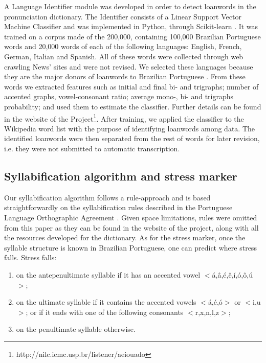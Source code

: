 A Language Identifier module was developed in order to detect loanwords in the pronunciation dictionary.
The Identifier consists of a Linear Support Vector Machine Classifier \cite{Steinwart2008} and was implemented in Python, 
through Scikit-learn \cite{Scikit2011}. It was trained on a corpus made of the 200,000, containing 100,000 Brazilian Portuguese
words and 20,000 words of each of the following languages: English, French, German, Italian and Spanish. All of these words were 
collected through web crawling News' sites and were not revised.
We selected these languages because they are the major donors of loanwords to Brazilian
Portuguese \cite{Alves2001}. From these words we extracted features such as initial and final bi- and trigraphs; 
number of accented graphs, vowel-consonant ratio; average mono-, bi- and trigraphs probability; and used 
them to estimate the classifier. Further details can be found in the website of the Project\footnote{http://nilc.icmc.usp.br/listener/aeiouado}. After training,
we applied the classifier to the Wikipedia word list with the purpose of identifying
loanwords among data. The identified loanwords were then separated from the rest of words for later 
revision, i.e. they were not submitted to automatic transcription.

\subsection{Syllabification algorithm and stress marker}

Our syllabification algorithm follows a rule-approach and is based straightforwardly on the syllabification
rules described in the Portuguese Language Orthographic Agreement \cite{Acordo2009}. Given space limitations,
rules were omitted from this paper as they can be found in the website of the project, along with all the
resources developed for the dictionary. As for the stress marker, once the syllable structure is known
in Brazilian Portuguese, one can predict where stress falls. Stress falls:

\begin{enumerate}
 \item on the antepenultimate syllable if it has an accented vowel $<$\'a,\^a,\'e,\^e,\'i,\'o,\^o,\'u$>$;
 \item on the ultimate syllable if it contains the accented vowels $<$\'a,\'e,\'o$>$ or $<$i,u$>$; or if it ends with one of the following consonants $<$r,x,n,l,z$>$;
 \item on the penultimate syllable otherwise.
\end{enumerate}


